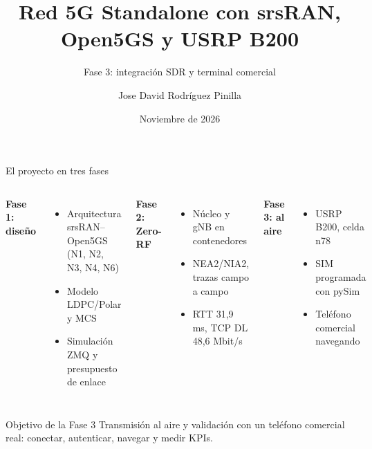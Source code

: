 \documentclass[aspectratio=169,10pt]{beamer}
\title[Red 5G SA con SDR]{Red 5G Standalone con srsRAN, Open5GS y USRP B200}
\subtitle{Fase 3: integración SDR y terminal comercial}
\author[J. D. Rodríguez]{Jose David Rodríguez Pinilla}
\institute[Icesi]{Sistemas y Comunicaciones 2 --- Universidad Icesi\\Docente: Andrés Navarro Cadavid, PhD}
\date{Noviembre de 2026}
\begin{document}
\begin{frame}
\titlepage
\end{frame}

\begin{frame}{El proyecto en tres fases}
\begin{columns}[T]
\textbf{Fase 1: diseño}
\begin{itemize}\small
  \item Arquitectura srsRAN--Open5GS (N1, N2, N3, N4, N6)
  \item Modelo LDPC/Polar y MCS
  \item Simulación ZMQ y presupuesto de enlace
\end{itemize}
\textbf{Fase 2: Zero-RF}
\begin{itemize}\small
  \item Núcleo y gNB en contenedores
  \item NEA2/NIA2, trazas campo a campo
  \item RTT 31,9 ms, TCP DL 48,6 Mbit/s
\end{itemize}
\textbf{Fase 3: al aire}
\begin{itemize}\small
  \item USRP B200, celda n78
  \item SIM programada con pySim
  \item \alert{Teléfono comercial navegando}
\end{itemize}
\end{columns}
\vspace{1em}
\begin{block}{Objetivo de la Fase 3}
Transmisión al aire y validación con un teléfono comercial real: conectar, autenticar, navegar y medir KPIs.
\end{block}
\end{frame}
\end{document}
